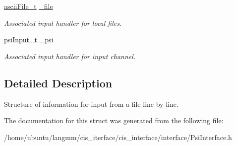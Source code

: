 \begin{DoxyCompactItemize}
\hyperlink{structasciiFile__t}{ascii\+File\+\_\+t} \hyperlink{structpsiAsciiFileInput__t_a520047f592ec4fe3b51430c9166c4cc2}{\+\_\+file}
\begin{DoxyCompactList}\small\item\em Associated input handler for local files. \end{DoxyCompactList}\item 
\mbox{\label{structpsiAsciiFileInput__t_a2b73b8fc2edb902484257337096573d9}} 
\hyperlink{structpsiInput__t}{psi\+Input\+\_\+t} \hyperlink{structpsiAsciiFileInput__t_a2b73b8fc2edb902484257337096573d9}{\+\_\+psi}
\begin{DoxyCompactList}\small\item\em Associated input handler for input channel. \end{DoxyCompactList}\end{DoxyCompactItemize}


\subsection{Detailed Description}
Structure of information for input from a file line by line. 

The documentation for this struct was generated from the following file\+:\begin{DoxyCompactItemize}
\item 
/home/ubuntu/langmm/cis\+\_\+iterface/cis\+\_\+interface/interface/Psi\+Interface.\+h\end{DoxyCompactItemize}

